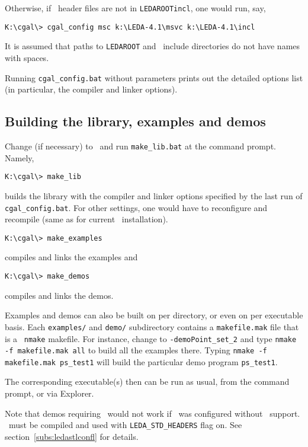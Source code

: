 Otherwise, if \leda\ header files are not in \texttt{LEDAROOT\bslsh incl}, 
one would run, say,

\begin{verbatim}
K:\cgal\> cgal_config msc k:\LEDA-4.1\msvc k:\LEDA-4.1\incl
\end{verbatim}

It is assumed that paths to \texttt{LEDAROOT} and \leda\ include
directories do not have names with spaces.

Running \texttt{cgal\_config.bat} without parameters prints out the detailed
options list (in particular, the compiler and linker options).


\subsection{Building the library, examples and demos}

Change (if necessary)
to \CGALR\ and run \texttt{make\_lib.bat} at the command prompt. Namely,
\begin{verbatim}
K:\cgal\> make_lib
\end{verbatim}

builds the library with the compiler and linker options specified
by the last run of \texttt{cgal\_config.bat}.
For other settings, one would have to reconfigure and recompile
(same as for current \leda\ installation).
\begin{verbatim}
K:\cgal\> make_examples
\end{verbatim}
compiles and links the examples and
\begin{verbatim}
K:\cgal\> make_demos
\end{verbatim}
compiles and links the demos. 

Examples and demos can also be built on per directory, or even on per
executable basis.  Each \texttt{examples/} and \texttt{demo/}
subdirectory contains a \texttt{makefile.mak} file that is a \mswin\ 
\texttt{nmake} makefile.  For instance, change to
\texttt{\cgal-\cgalrelease\bslsh demo\bslsh Point\_set\_2} and type
\texttt{nmake -f makefile.mak all} to build all the examples there.
Typing \texttt{nmake -f makefile.mak ps\_test1} will build the
particular demo program \texttt{ps\_test1}.

The corresponding executable(s) then can be run as usual, from the
command prompt, or via Explorer.

Note that demos requiring \leda\ would not work if \cgal\ was
configured without \leda\ support.  \leda\ must be compiled and used
with \texttt{LEDA\_STD\_HEADERS} flag on. See
section~\ref{subs:ledastlconfl} for details.


